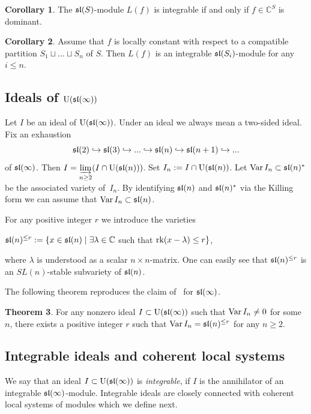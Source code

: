 \documentclass[10pt]{amsart}\oddsidemargin -1mm \evensidemargin -1mm \topmargin -15mm\headheight5mm \headsep 3.5mm \textheight 245mm\textwidth 170mm %
\theoremstyle{definition}\newtheorem{theorem}{Theorem}[section]\newtheorem{lemma}[theorem]{Lemma}\newtheorem{remark}[theorem]{Remark}\newtheorem{proposition}[theorem]{Proposition}\newtheorem{corollary}[theorem]{Corollary}\newtheorem{definition}[theorem]{Definition}\newtheorem{Ex}[theorem]{Example}
\newcounter{AP}
\begin{document}
\begin{corollary}\label{Ldom} The $\frak{sl}(S)$-module $L(f)$ is integrable if and only if
$f\in \mathbb C^S$ is dominant.\end{corollary}
\begin{corollary}\label{Ppint}Assume that $f$ is locally constant with respect to a compatible partition $S_1\sqcup...\sqcup S_n$ of $S$. Then $L(f)$ is an integrable $\frak{sl}(S_i)$-module for any $i\le n$.\end{corollary}

\subsection{Ideals of $\operatorname{\mathrm{U}}(\frak{sl}(\infty))$}
Let $I$ be an ideal of $\operatorname{\mathrm{U}}(\frak{sl}(\infty))$. Under an ideal we always mean a two-sided ideal. Fix an exhaustion
\begin{equation}\frak{sl}(2)\hookrightarrow\frak{sl}(3)\hookrightarrow...\hookrightarrow\frak{sl}(n)\hookrightarrow\frak{sl}(n+1)\hookrightarrow...\label{Eex}\end{equation}of
$\frak{sl}(\infty)$. Then $I=\varinjlim\limits_{n\ge2}(I\cap\operatorname{\mathrm{U}}(\frak{sl}(n)))$. Set $I_n:=I\cap\operatorname{\mathrm{U}}(\frak{sl}(n))$. Let $\operatorname{\mathrm{Var}} I_n\subset\frak{sl}(n)^*$ be the associated variety of~$I_n$. By identifying $\frak{sl}(n)$ and $\frak{sl}(n)^*$ via the Killing form we can assume that $\operatorname{\mathrm{Var}} I_n\subset\frak{sl}(n)$.

For any positive integer $r$ we introduce the varieties
\begin{center}$\frak{sl}(n)^{\le r}:=\{x\in\frak{sl}(n)\mid
\exists\lambda\in\mathbb C$ such that $\operatorname{\mathrm{rk}} (x-\lambda)\le
r\}$,\end{center}where $\lambda$ is understood as a scalar $n\times n$-matrix. One can easily see that
$\frak{sl}(n)^{\le r}$ is an $SL(n)$-stable subvariety of $\frak{sl}(n)$.

The following theorem reproduces the claim of~\cite[Corollary~6.2~b)]{PP} for $\frak{sl}(\infty)$.
\begin{theorem}\label{Tuslrk}For any nonzero ideal $I\subset\operatorname{\mathrm{U}}(\frak{sl}(\infty))$ such that  $\operatorname{\mathrm{Var}} I_n\ne 0$ for some $n$, there exists a positive integer $r$ such that $\operatorname{\mathrm{Var}} I_n=\frak{sl}(n)^{\le r}$ for any $n\ge2$.\end{theorem}

\subsection{Integrable ideals and coherent local systems}\label{SSzhi}
We say that an ideal $I\subset\operatorname{\mathrm{U}}(\frak{sl}(\infty))$ is {\it integrable}, if $I$ is the annihilator of an integrable $\frak{sl}(\infty)$-module. Integrable ideals are closely connected with coherent local systems of modules which we define next.
\end{document}
